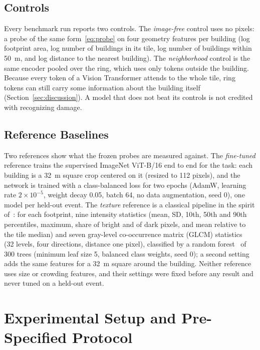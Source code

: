 \documentclass{ieeeaccess}
\begin{document}
\subsection{Controls}
Every benchmark run reports two controls. The \emph{image-free} control uses no pixels: a probe of the same form~\eqref{eq:probe} on four geometry features per building (log footprint area, log number of buildings in its tile, log number of buildings within 50~m, and log distance to the nearest building). The \emph{neighborhood} control is the same encoder pooled over the ring, which uses only tokens outside the building. Because every token of a Vision Transformer attends to the whole tile, ring tokens can still carry some information about the building itself (Section~\ref{sec:discussion}). A model that does not beat its controls is not credited with recognizing damage.

\subsection{Reference Baselines}
\label{sec:baselines}
Two references show what the frozen probes are measured against. The \emph{fine-tuned} reference trains the supervised ImageNet ViT-B/16 end to end for the task: each building is a 32~m square crop centered on it (resized to 112 pixels), and the network is trained with a class-balanced loss for two epochs (AdamW, learning rate $2\times10^{-5}$, weight decay 0.05, batch 64, no data augmentation, seed 0), one model per held-out event. The \emph{texture} reference is a classical pipeline in the spirit of~\cite{macchiarulo2025sar}: for each footprint, nine intensity statistics (mean, SD, 10th, 50th and 90th percentiles, maximum, share of bright and of dark pixels, and mean relative to the tile median) and seven gray-level co-occurrence matrix (GLCM) statistics~\cite{haralick1973texture} (32 levels, four directions, distance one pixel), classified by a random forest~\cite{breiman2001rf} of 300 trees (minimum leaf size 5, balanced class weights, seed 0); a second setting adds the same features for a 32~m square around the building. Neither reference uses size or crowding features, and their settings were fixed before any result and never tuned on a held-out event.

\section{Experimental Setup and Pre-Specified Protocol}
\label{sec:setup}
\end{document}
